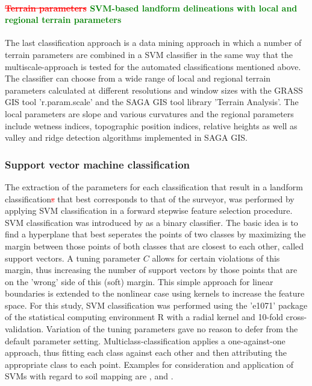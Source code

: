 \documentclass[preprint,12pt,authoryear]{elsarticle}
\begin{document}
\paragraph{\textcolor{red}{\sout{Terrain parameters}} \textcolor{green}{SVM-based landform delineations with local and regional terrain parameters}}
The last classification approach is a data mining approach in which a number of terrain parameters are combined in a SVM classifier in the same way that the multiscale-approach is tested for the automated classifications mentioned above. The classifier can choose from a wide range of local and regional terrain parameters calculated at different resolutions and window sizes with the GRASS GIS tool 'r.param.scale' and the SAGA GIS tool library 'Terrain Analysis'. The local parameters are slope and various curvatures and the regional parameters include wetness indices, topographic position indices, relative heights as well as valley and ridge detection algorithms implemented in SAGA GIS.  
\subsubsection{Support vector machine classification}
The extraction of the parameters for each classification that result in a landform classification\textcolor{red}{\sout{s}} that best corresponds to that of the surveyor, was performed by applying SVM classification in a forward stepwise feature selection procedure. SVM classification was introduced by \cite{Cortes1995} as a binary classifier. The basic idea is to find a hyperplane that best seperates the points of two classes by maximizing the margin between those points of both classes that are closest to each other, called support vectors. A tuning parameter $C$ allows for certain violations of this margin, thus increasing the number of support vectors by those points that are on the 'wrong' side of this (soft) margin. This simple approach for linear boundaries is extended to the nonlinear case using kernels to increase the feature space. For this study, SVM classification was performed using the 'e1071' package \citep{meyer2014} of the statistical computing environment R \citep{cran2014} with a radial kernel and 10-fold cross-validation. Variation of the tuning parameters gave  no reason to defer from the default parameter setting. Multiclass-classification applies a one-against-one approach, thus fitting each class against each other and then attributing the appropriate class to each point. Examples for consideration and application of SVMs with regard to soil mapping are \cite{Ballabio2009}, \cite{Behrens2006} and \cite{Rossel2010}.
\end{document}
